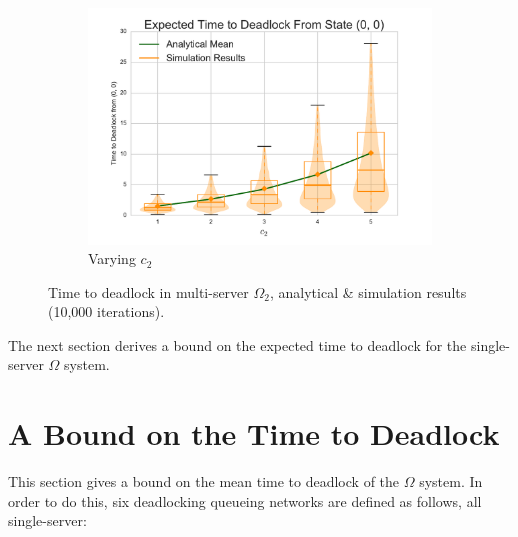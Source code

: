 \documentclass{article}
\numberwithin{equation}{section}
\begin{document}
\begin{figure}[!htbp]
\begin{center}
\begin{subfigure}[b]{0.34\textwidth}
    \includegraphics[width=\textwidth]{images/varyc2_2Nms}
    \caption{Varying $c_2$}
    \label{fig:2Nms_c2}
  \end{subfigure}
  \end{center}
  \caption{Time to deadlock in multi-server $\Omega_2$, analytical \& simulation results (10,000 iterations).}
  \label{fig:timestodeadlock2nodemultiserver}
\end{figure}

The next section derives a bound on the expected time to deadlock for the single-server $\Omega$ system.













\section{A Bound on the Time to Deadlock}\label{sec:bound}

This section gives a bound on the mean time to deadlock of the $\Omega$ system.
In order to do this, six deadlocking queueing networks are defined as follows, all single-server:
\end{document}
